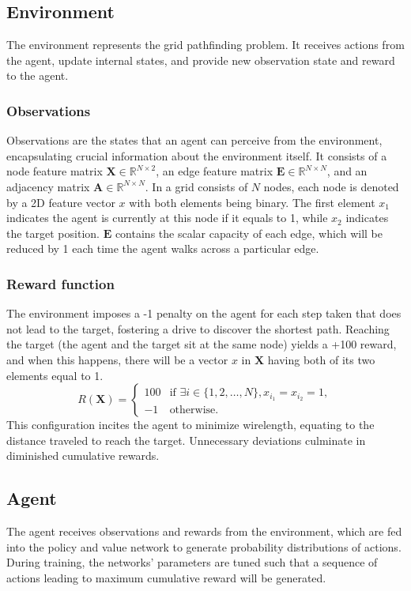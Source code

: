 \documentclass[letterpaper]{article}
\begin{document}
\subsection{Environment}
The environment represents the grid pathfinding problem. It receives actions
from the agent, update internal states, and provide new observation state and
reward to the agent.
\subsubsection{Observations}
Observations are the states that an agent can perceive from the environment,
encapsulating crucial information about the environment itself. It consists of a
node feature matrix $\mathbf{X} \in \mathbb{R}^{N \times 2}$, an edge feature
matrix $\mathbf{E} \in \mathbb{R}^{N \times N}$, and an adjacency matrix
$\mathbf{A} \in \mathbb{R}^{N \times N}$. In a grid consists of $N$ nodes, each
node is denoted by a 2D feature vector $x$ with both elements being binary. The
first element $x_1$ indicates the agent is currently at this node if it equals
to 1, while $x_2$ indicates the target position. $\mathbf{E}$ contains the
scalar capacity of each edge, which will be reduced by 1 each time the agent
walks across a particular edge. 


\subsubsection{Reward function}
The environment imposes a -1 penalty on the agent for each step taken that does
not lead to the target, fostering a drive to discover the shortest path.
Reaching the target (the agent and the target sit at the same node) yields a
+100 reward, and when this happens, there will be a vector $x$ in $\mathbf{X}$
having both of its two elements equal to 1.
\begin{equation}
    R(\mathbf{X}) = \begin{cases} 
    100 & \text{if } \exists i \in \{1, 2, \ldots, N\}, x_{i_1} = x_{i_2} = 1, \\
    -1 & \text{otherwise}.
    \end{cases}
    \end{equation}
This configuration incites the agent to minimize wirelength, equating to the
distance traveled to reach the target. Unnecessary deviations culminate in
diminished cumulative rewards.

\subsection{Agent}
The agent receives observations and rewards from the environment, which are fed
into the policy and value network to generate probability distributions of
actions. During training, the networks' parameters are tuned such that a
sequence of actions leading to maximum cumulative reward will be generated. 
\end{document}
